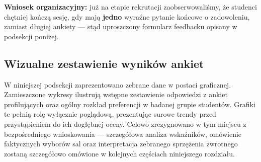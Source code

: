 \documentclass[14pt,a4paper]{extarticle}
\begin{document}
\begin{table}[H]
    \centering
    \caption{Charakterystyka uczestników testów terenowych aplikacji MiniInfo ($N=45$).}
    \label{tab:charakterystyka}
\end{table}

\textbf{Wniosek organizacyjny:} już na etapie rekrutacji zaobserwowaliśmy, że studenci chętniej kończą sesję, gdy mają \textbf{jedno} wyraźne pytanie końcowe o zadowoleniu, zamiast długiej ankiety --- stąd uproszczony formularz feedbacku opisany w podsekcji poniżej.

\subsection{Wizualne zestawienie wyników ankiet}

W niniejszej podsekcji zaprezentowano zebrane dane w postaci graficznej. Zamieszczone wykresy ilustrują wstępne zestawienie odpowiedzi z ankiet profilujących oraz ogólny rozkład preferencji w badanej grupie studentów. Grafiki te pełnią rolę wyłącznie poglądową, prezentując surowe trendy przed przystąpieniem do ich dogłębnej oceny. Celowo zrezygnowano w tym miejscu z bezpośredniego wnioskowania --- szczegółowa analiza wskaźników, omówienie faktycznych wyborów sal oraz interpretacja zebranego sprzężenia zwrotnego zostaną szczegółowo omówione w kolejnych częściach niniejszego rozdziału.
\end{document}
